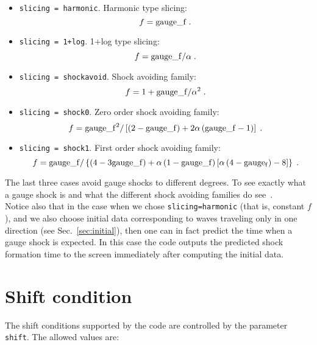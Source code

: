 \documentclass[12pt]{article}
\begin{document}
\begin{itemize}

\item \texttt{slicing = harmonic}. Harmonic type slicing:
\[f = {\rm gauge\_f} \; .\]

\item \texttt{slicing  =  1+log}. 1+log type slicing:
\[f = {\rm gauge\_f} / \alpha \; . \]

\item \texttt{slicing = shockavoid}. Shock avoiding family:
\[f = 1 + {\rm gauge\_f}/\alpha^2 \; . \]

\item \texttt{slicing = shock0}. Zero order shock avoiding family:
\[f = {\rm gauge\_f}^2 / \left[ \left( 2 - {\rm gauge\_f} \right)
+ 2 \alpha \left( {\rm gauge\_f} - 1 \right) \right] \; . \]

\item \texttt{slicing = shock1}. First order shock avoiding family:
\[f = {\rm gauge\_f} / \left\{ \left( 4 - 3 {\rm gauge\_f} \right)
+ \alpha \left( 1 - {\rm gauge\_f} \right) \left[ \alpha \left( 4 - {\rm gauge_f}
\right) -8 \right] \right\} \; . \]

\end{itemize}

The last three cases avoid gauge shocks to different degrees.  To see
exactly what a gauge shock is and what the different shock avoiding
families do see~\cite{Alcubierre97a,Alcubierre02b,Alcubierre:2005gw}. \\

Notice also that in the case when we chose \texttt{slicing=harmonic}
(that is, constant $f$), and we also choose initial data corresponding
to waves traveling only in one direction (see Sec.~\ref{sec:initial}),
then one can in fact predict the time when a gauge shock is expected.
In this case the code outputs the predicted shock formation time to
the screen immediately after computing the initial data.



\setcounter{equation}{0}
\section{Shift condition}
\label{sec:shift}

The shift conditions supported by the code are controlled by the
parameter {\texttt{shift}}.  The allowed values are:
\end{document}
